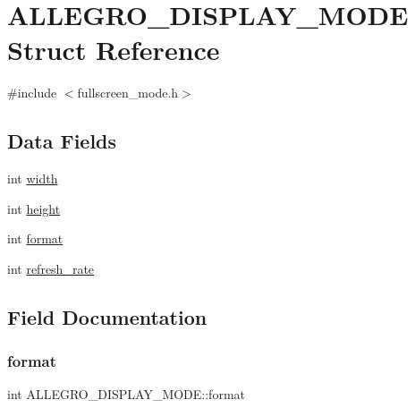 \hypertarget{struct_a_l_l_e_g_r_o___d_i_s_p_l_a_y___m_o_d_e}{}\section{A\+L\+L\+E\+G\+R\+O\+\_\+\+D\+I\+S\+P\+L\+A\+Y\+\_\+\+M\+O\+DE Struct Reference}
\label{struct_a_l_l_e_g_r_o___d_i_s_p_l_a_y___m_o_d_e}


{\ttfamily \#include $<$fullscreen\+\_\+mode.\+h$>$}

\subsection*{Data Fields}
\begin{DoxyCompactItemize}
\item 
int \hyperlink{struct_a_l_l_e_g_r_o___d_i_s_p_l_a_y___m_o_d_e_a2692f1fe9b3d29f348b7b77aad72fa21}{width}
\item 
int \hyperlink{struct_a_l_l_e_g_r_o___d_i_s_p_l_a_y___m_o_d_e_a2e6c4b46f9d9103e507fcfeab69a051e}{height}
\item 
int \hyperlink{struct_a_l_l_e_g_r_o___d_i_s_p_l_a_y___m_o_d_e_adaa23480acd6bb5c646dfd0a92300533}{format}
\item 
int \hyperlink{struct_a_l_l_e_g_r_o___d_i_s_p_l_a_y___m_o_d_e_a70f5ad7633fea1d1e2ad37cb2fc8d0b2}{refresh\+\_\+rate}
\end{DoxyCompactItemize}


\subsection{Field Documentation}
\mbox{\label{struct_a_l_l_e_g_r_o___d_i_s_p_l_a_y___m_o_d_e_adaa23480acd6bb5c646dfd0a92300533}} 
\subsubsection{\texorpdfstring{format}{format}}
{\footnotesize\ttfamily int A\+L\+L\+E\+G\+R\+O\+\_\+\+D\+I\+S\+P\+L\+A\+Y\+\_\+\+M\+O\+D\+E\+::format}

